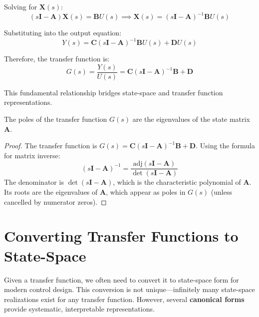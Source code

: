 Solving for $\mathbf{X}(s)$:
\begin{equation}
(s\mathbf{I} - \mathbf{A})\mathbf{X}(s) = \mathbf{B}U(s) \implies \mathbf{X}(s) = (s\mathbf{I} - \mathbf{A})^{-1}\mathbf{B}U(s)
\end{equation}

Substituting into the output equation:
\begin{equation}
Y(s) = \mathbf{C}(s\mathbf{I} - \mathbf{A})^{-1}\mathbf{B}U(s) + \mathbf{D}U(s)
\end{equation}

Therefore, the transfer function is:
\begin{equation}
\boxed{G(s) = \frac{Y(s)}{U(s)} = \mathbf{C}(s\mathbf{I} - \mathbf{A})^{-1}\mathbf{B} + \mathbf{D}}
\label{eq:ss_to_tf}
\end{equation}

This fundamental relationship bridges state-space and transfer function representations.

\begin{theorem}
The poles of the transfer function $G(s)$ are the eigenvalues of the state matrix $\mathbf{A}$.
\end{theorem}

\begin{proof}
The transfer function is $G(s) = \mathbf{C}(s\mathbf{I} - \mathbf{A})^{-1}\mathbf{B} + \mathbf{D}$. Using the formula for matrix inverse:
\begin{equation}
(s\mathbf{I} - \mathbf{A})^{-1} = \frac{\text{adj}(s\mathbf{I} - \mathbf{A})}{\det(s\mathbf{I} - \mathbf{A})}
\end{equation}
The denominator is $\det(s\mathbf{I} - \mathbf{A})$, which is the characteristic polynomial of $\mathbf{A}$. Its roots are the eigenvalues of $\mathbf{A}$, which appear as poles in $G(s)$ (unless cancelled by numerator zeros).
\end{proof}

\section{Converting Transfer Functions to State-Space}
\label{sec:tf_to_ss}

Given a transfer function, we often need to convert it to state-space form for modern control design. This conversion is not unique---infinitely many state-space realizations exist for any transfer function. However, several \textbf{canonical forms} provide systematic, interpretable representations.

